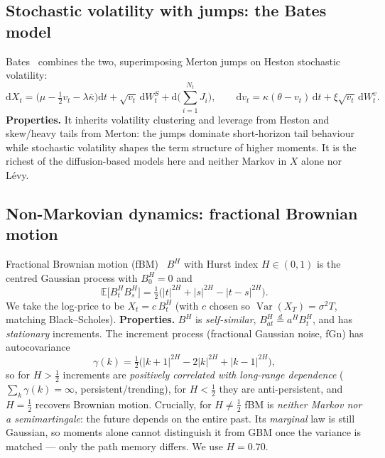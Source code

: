 \documentclass[11pt]{article}
\newcommand{\dd}{\mathrm{d}}
\newcommand{\E}{\mathbb{E}}
\newcommand{\Var}{\operatorname{Var}}
\begin{document}
\subsection{Stochastic volatility with jumps: the Bates model}
Bates~\cite{Bates1996} combines the two, superimposing Merton jumps on Heston
stochastic volatility:
\begin{equation}
  \dd X_t = \Big(\mu - \tfrac12 v_t - \lambda\bar\kappa\Big)\dd t
            + \sqrt{v_t}\,\dd W_t^{S} + \dd\!\Big(\textstyle\sum_{i=1}^{N_t} J_i\Big),
  \qquad
  \dd v_t = \kappa(\theta - v_t)\,\dd t + \xi\sqrt{v_t}\,\dd W_t^{v}.
\end{equation}
\textbf{Properties.} It inherits volatility clustering and leverage from Heston and
skew/heavy tails from Merton: the jumps dominate short-horizon tail behaviour while
stochastic volatility shapes the term structure of higher moments. It is the
richest of the diffusion-based models here and neither Markov in $X$ alone nor
L\'evy.

\subsection{Non-Markovian dynamics: fractional Brownian motion}
Fractional Brownian motion (fBM)~\cite{MandelbrotVanNess1968} $B^{H}$ with Hurst
index $H\in(0,1)$ is the centred Gaussian process with $B^H_0=0$ and
\begin{equation}
  \E\!\big[B^{H}_t B^{H}_s\big]
  = \tfrac12\big(|t|^{2H} + |s|^{2H} - |t-s|^{2H}\big).
\end{equation}
We take the log-price to be $X_t = c\,B^{H}_t$ (with $c$ chosen so
$\Var(X_T)=\sigma^2 T$, matching Black--Scholes). \textbf{Properties.} $B^H$ is
\emph{self-similar}, $B^{H}_{at}\stackrel{d}{=}a^{H}B^{H}_t$, and has
\emph{stationary} increments. The increment process (fractional Gaussian noise,
fGn) has autocovariance
\begin{equation}\label{eq:fgn}
  \gamma(k) = \tfrac12\big(|k+1|^{2H} - 2|k|^{2H} + |k-1|^{2H}\big),
\end{equation}
so for $H>\tfrac12$ increments are \emph{positively correlated with long-range
dependence} ($\sum_k\gamma(k)=\infty$, persistent/trending), for $H<\tfrac12$ they
are anti-persistent, and $H=\tfrac12$ recovers Brownian motion. Crucially, for
$H\ne\tfrac12$ fBM is \emph{neither Markov nor a semimartingale}: the future
depends on the entire past. Its \emph{marginal} law is still Gaussian, so moments
alone cannot distinguish it from GBM once the variance is matched --- only the path
memory differs. We use $H=0.70$.
\end{document}
